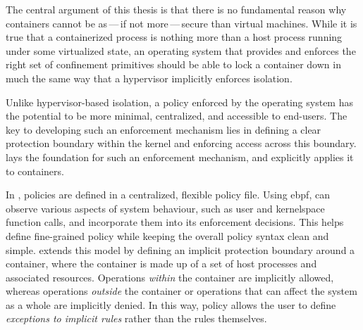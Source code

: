 

The central argument of this thesis is that there is no fundamental reason why containers
cannot be as\,---\,if not more\,---\,secure than virtual machines. While it is true that
a containerized process is nothing more than a host process running under some virtualized
state, an operating system that provides and enforces the right set of confinement
primitives should be able to lock a container down in much the same way that a hypervisor
implicitly enforces isolation. 



Unlike hypervisor-based isolation, a policy enforced by the operating system has the
potential to be more minimal, centralized, and accessible to end-users. The key to
developing such an enforcement mechanism lies in defining a clear protection boundary
within the kernel and enforcing access across this boundary. \bpfbox{} lays the foundation
for such an enforcement mechanism, and \bpfcontain{} explicitly applies it to containers.

In \bpfbox{}, policies are defined in a centralized, flexible policy file. Using
\gls{ebpf}, \bpfbox{} can observe various aspects of system behaviour, such as user and
kernelspace function calls, and incorporate them into its enforcement decisions. This
helps define fine-grained policy while keeping the overall policy syntax clean and simple.
\bpfcontain{} extends this model by defining an implicit protection boundary around
a container, where the container is made up of a set of host processes and associated
resources. Operations \textit{within} the container are implicitly allowed, whereas
operations \textit{outside} the container or operations that can affect the system as
a whole are implicitly denied. In this way, \bpfcontain{} policy allows the user to define
\textit{exceptions to implicit rules} rather than the rules themselves.

